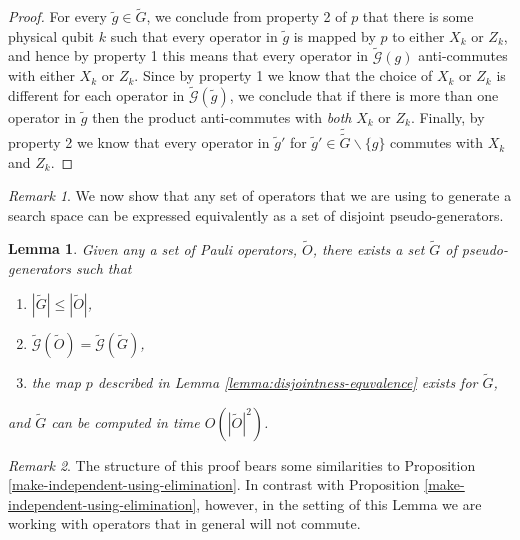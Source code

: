 \documentclass[12pt]{amsbook}
\theoremstyle{plain}
\newtheorem{lemma}{Lemma}
\theoremstyle{definition}
\theoremstyle{remark}
\newtheorem{remark}{Remark}
\newcommand{\set}{\tilde}
\newcommand{\genfun}{\tilde{\mathcal{G}}}
\begin{document}
\begin{proof}
For every $\set g\in\set G$, we conclude from property 2 of $p$ that there is some physical qubit $k$ such that every operator in $\set g$ is mapped by $p$ to either $X_k$ or $Z_k$, and hence by property 1 this means that every operator in $\genfun(g)$ anti-commutes with either $X_k$ or $Z_k$.  Since by property 1 we know that the choice of $X_k$ or $Z_k$ is different for each operator in $\genfun(\set g)$, we conclude that if there is more than one operator in $\set g$ then the product anti-commutes with \emph{both} $X_k$ or $Z_k$.  Finally, by property 2 we know that every operator in $\set g'$ for $\set g'\in\set \set G\backslash\{g\}$ commutes with $X_k$ and $Z_k$.
\end{proof}

\begin{remark}
We now show that any set of operators that we are using to generate a search space can be expressed equivalently as a set of disjoint pseudo-generators.
\end{remark}

\begin{lemma}
\label{lemma:computing-disjoint-pseudo-generators}
Given any a set of Pauli operators, $\set O$, there exists a set $\set G$ of pseudo-generators such that
\begin{enumerate}
\item $|\set G|\le|\set O|$,
\item $\genfun(\set O)=\genfun(\set G)$,
\item the map $p$ described in Lemma \ref{lemma:disjointness-equvalence} exists for $\set G$,
\end{enumerate}
and $\set G$ can be computed in time $O(|\set O|^2)$.
\end{lemma}

\begin{remark}
The structure of this proof bears some similarities to Proposition \ref{make-independent-using-elimination}.  In contrast with Proposition \ref{make-independent-using-elimination}, however, in the setting of this Lemma we are working with operators that in general will not commute.
\end{remark}
\end{document}
